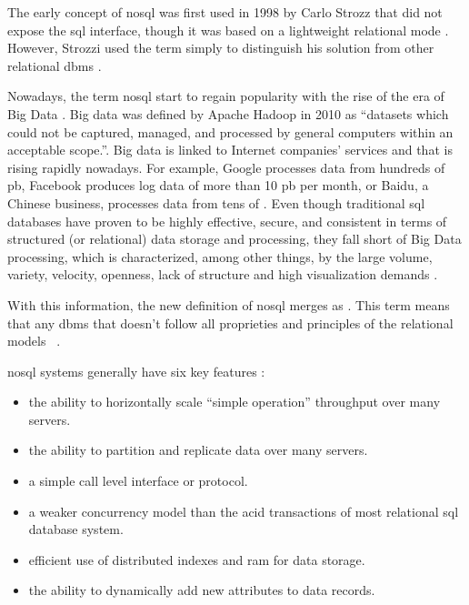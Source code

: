 The early concept of \gls{nosql} was first used in 1998 by Carlo Strozz \cite{NoSQLRel28:online} that did not expose the \gls{sql} interface, though it was based on a lightweight relational mode \cite{breiefreview,nosqlchoose,wuoverview}. However, Strozzi used the term simply to distinguish his solution from other relational \gls{dbms} \cite{nosqlchoose}.

Nowadays, the term \gls{nosql} start to regain popularity with the rise of the era of Big Data \cite{nosqlchoose}. Big data was defined by Apache Hadoop in 2010 as “datasets which could not be captured, managed, and processed by general computers within an acceptable scope.”. Big data is linked to Internet companies' services and that is rising rapidly nowadays. For example, Google processes data from hundreds of \gls{pb}, Facebook produces log data of more than 10 \gls{pb} per month, or Baidu, a Chinese business, processes data from tens of  \cite{chen2014big}. Even though traditional \gls{sql} databases have proven to be highly effective, secure, and consistent in terms of structured (or relational) data storage and processing, they fall short of Big Data processing, which is characterized, among other things, by the large volume, variety, velocity, openness, lack of structure and high visualization demands \cite{nosqlchoose,https://doi.org/10.1002/cpe.3398}.

With this information, the new definition of \gls{nosql} merges as . This term means that any \gls{dbms} that doesn't follow all proprieties and principles of the relational models ~\cite{wuoverview,nosqlchoose,breiefreview}. ~

\gls{nosql} systems generally have six key features \cite{cattell2011scalable}:
\begin{itemize}
    \item the ability to horizontally scale “simple operation” throughput over many servers. 
    \item the ability to partition and replicate data over many servers.
    \item a simple call level interface or protocol.
    \item a weaker concurrency model than the \gls{acid} transactions of most relational \gls{sql} database system.
    \item efficient use of distributed indexes and \gls{ram} for
data storage.
    \item the ability to dynamically add new attributes to data records.
\end{itemize}

